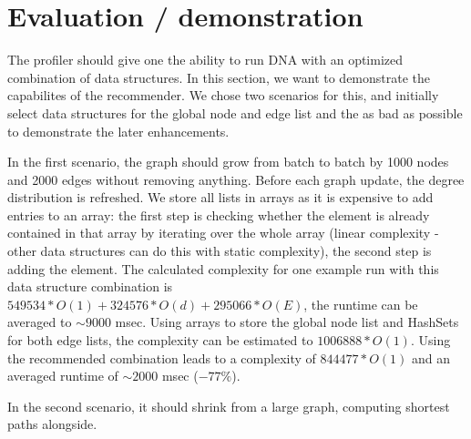 \section{Evaluation / demonstration}
	The profiler should give one the ability to run DNA with an optimized combination of data
	structures. In this section, we want to demonstrate the capabilites of the recommender.
	We chose two scenarios for this, and initially select data structures for the global node
	and edge list and the  as bad as possible to demonstrate the later enhancements.
	
	In the first scenario, the graph should grow from batch to batch by 1000 nodes and 2000
	edges without removing anything. Before each graph update, the degree distribution is
	refreshed. We store all lists in arrays as it is expensive to add entries to an array:
	the first step is checking whether the element is already contained in that array by
	iterating over the whole array (linear complexity - other data structures can do this
	with static complexity), the second step is adding the element. The calculated complexity
	for one example run with this data structure combination is $549534*O(1) + 324576*O(d) +
	295066*O(E)$, the runtime can be averaged to $\sim 9000$ msec. Using arrays to store the
	global node list and HashSets for both edge lists, the complexity can be estimated to
	$1006888*O(1)$. Using the recommended combination leads to a complexity of $844477*O(1)$
	and an averaged runtime of $\sim 2000$ msec ($- 77\%$).
	
	In the second scenario, it should shrink from a large graph, computing shortest paths
	alongside. 
	
	
